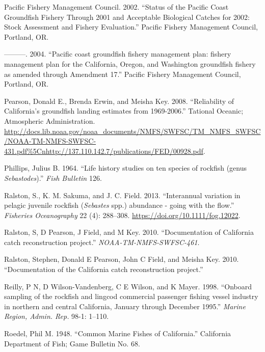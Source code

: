 \documentclass[11pt,
  english,
  a4paper,
]{article}
\newlength{\cslhangindent}
\newenvironment{CSLReferences}[2] %
 {%
  \setlength{\parindent}{0pt}
  \ifodd #1 \everypar{\setlength{\hangindent}{\cslhangindent}}\ignorespaces\fi
  \ifnum #2 > 0
  \setlength{\parskip}{#2\baselineskip}
  \fi
 }%
 {}
\begin{document}
\begin{CSLReferences}{1}{0}
\leavevmode{}%
Pacific Fishery Management Council. 2002. {``{Status of the Pacific Coast Groundfish Fishery Through 2001 and Acceptable Biological Catches for 2002: Stock Assessment and Fishery Evaluation.}''} Pacific Fishery Management Council, Portland, OR.

\leavevmode{}%
---------. 2004. {``{Pacific coast groundfish fishery management plan: fishery management plan for the California, Oregon, and Washington groundfish fishery as amended through Amendment 17}.''} Pacific Fishery Management Council, Portland, OR.

\leavevmode{}%
Pearson, Donald E., Brenda Erwin, and Meisha Key. 2008. {``{Reliability of California's groundfish landing estimates from 1969-2006}.''} Tational Oceanic; Atmospheric Administration. \url{http://docs.lib.noaa.gov/noaa_documents/NMFS/SWFSC/TM_NMFS_SWFSC/NOAA-TM-NMFS-SWFSC-431.pdf\%5Cnhttp://137.110.142.7/publications/FED/00928.pdf}.

\leavevmode{}%
Phillips, Julius B. 1964. {``{Life history studies on ten species of rockfish (genus \emph{Sebastodes})}.''} \emph{Fish Bulletin} 126.

\leavevmode{}%
Ralston, S., K. M. Sakuma, and J. C. Field. 2013. {``{Interannual variation in pelagic juvenile rockfish (\emph{Sebastes} spp.) abundance - going with the flow}.''} \emph{Fisheries Oceanography} 22 (4): 288--308. \url{https://doi.org/10.1111/fog.12022}.

\leavevmode{}%
Ralston, S, D Pearson, J Field, and M Key. 2010. {``{Documentation of California catch reconstruction project.}''} \emph{NOAA-TM-NMFS-SWFSC-461}.

\leavevmode{}%
Ralston, Stephen, Donald E Pearson, John C Field, and Meisha Key. 2010. {``{Documentation of the California catch reconstruction project}.''}

\leavevmode{}%
Reilly, P N, D Wilson-Vandenberg, C E Wilson, and K Mayer. 1998. {``{Onboard sampling of the rockfish and lingcod commercial passenger fishing vessel industry in northern and central California, January through December 1995.}''} \emph{Marine Region, Admin. Rep.} 98-1: 1--110.

\leavevmode{}%
Roedel, Phil M. 1948. {``{Common Marine Fishes of California}.''} California Department of Fish; Game Bulletin No. 68.


\end{CSLReferences}
\end{document}
